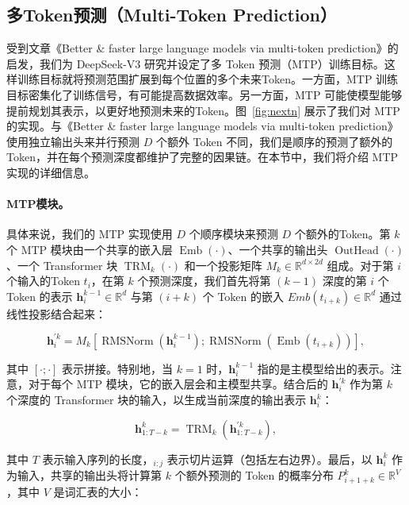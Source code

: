 \documentclass[lang=cn,a4paper,newtx]{elegantpaper}
\newcommand{\dsviii}{DeepSeek-V3}
\begin{document}
\subsection{多Token预测（Multi-Token Prediction）}

受到文章《Better \& faster large language models via multi-token prediction》的启发，我们为 \dsviii{} 研究并设定了多 Token 预测（MTP）训练目标。这样训练目标就将预测范围扩展到每个位置的多个未来Token。一方面，MTP 训练目标密集化了训练信号，有可能提高数据效率。另一方面，MTP 可能使模型能够提前规划其表示，以更好地预测未来的Token。图~\ref{fig:nextn} 展示了我们对 MTP 的实现。与《Better \& faster large language models via multi-token prediction》使用独立输出头来并行预测 $D$ 个额外 Token 不同，我们是顺序的预测了额外的Token，并在每个预测深度都维护了完整的因果链。在本节中，我们将介绍 MTP 实现的详细信息。

\paragraph{MTP模块。}
具体来说，我们的 MTP 实现使用 $D$ 个顺序模块来预测 $D$ 个额外的Token。第 $k$ 个 MTP 模块由一个共享的嵌入层 $\operatorname{Emb}(\cdot)$、一个共享的输出头 $\operatorname{OutHead}(\cdot)$、一个 Transformer 块 $\operatorname{TRM}_k(\cdot)$ 和一个投影矩阵 $M_k \in \mathbb{R}^{d \times 2d}$ 组成。对于第 $i$ 个输入的Token $t_i$，在第 $k$ 个预测深度，我们首先将第 $(k-1)$ 深度的第 $i$ 个 Token 的表示 $\mathbf{h}_i^{k-1} \in \mathbb{R}^{d}$ 与第 $(i+k)$ 个 Token 的嵌入 $Emb(t_{i+k}) \in \mathbb{R}^{d}$ 通过线性投影结合起来：

\begin{equation}
    \mathbf{h}_i^{\prime k} = M_k [\operatorname{RMSNorm}(\mathbf{h}_i^{k-1}) ; \operatorname{RMSNorm}(\operatorname{Emb}(t_{i+k}))],
\end{equation}

其中 $[\cdot ; \cdot]$ 表示拼接。特别地，当 $k=1$ 时，$\mathbf{h}_i^{k-1}$ 指的是主模型给出的表示。注意，对于每个 MTP 模块，它的嵌入层会和主模型共享。结合后的 $\mathbf{h}_i^{\prime k}$ 作为第 $k$ 个深度的 Transformer 块的输入，以生成当前深度的输出表示 $\mathbf{h}_{i}^{k}$：

\begin{equation}
    \mathbf{h}_{1:T-k}^{k} = \operatorname{TRM}_k(\mathbf{h}_{1:T-k}^{\prime k}),
\end{equation}

其中 $T$ 表示输入序列的长度，$_{i:j}$ 表示切片运算（包括左右边界）。最后，以 $\mathbf{h}_{i}^{k}$ 作为输入，共享的输出头将计算第 $k$ 个额外预测的 Token 的概率分布 $P_{i+1+k}^{k} \in \mathbb{R}^{V}$，其中 $V$ 是词汇表的大小：
\end{document}
